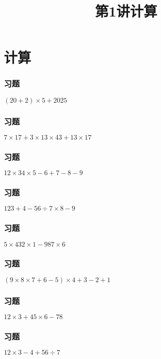 \section{计算}

\title[第1讲\quad 计算]{第1讲\quad 计算} 
\author{}
\date{}
\begin{frame}
    \titlepage
\end{frame}

\begin{frame}
    \frametitle{习题\theframecounter}
    \centering\textit{\Large $(20+2)\times 5 + 2025$}
\end{frame}

\begin{frame}
    \frametitle{习题\theframecounter}
    \centering\textit{\Large $7\times 17 + 3\times 13\times 43 + 13\times 17$}
\end{frame}

\begin{frame}
    \frametitle{习题\theframecounter}
    \centering\textit{\Large $12\times 34\times 5 - 6 + 7 - 8 - 9$}
\end{frame}

\begin{frame}
    \frametitle{习题\theframecounter}    \centering\textit{\Large $123 + 4 - 56\div 7\times 8 - 9$}
\end{frame}

\begin{frame}
    \frametitle{习题\theframecounter}    \centering\textit{\Large $5\times 432\times 1 - 98 7\times 6$}
\end{frame}

\begin{frame}
    \frametitle{习题\theframecounter}    \centering\textit{\Large $(9\times 8\times 7 + 6 - 5)\times 4 + 3 -2 +1$}
\end{frame}

\begin{frame}
    \frametitle{习题\theframecounter}    \centering\textit{\Large $12\times 3 + 45\times 6 - 78$}
\end{frame}

\begin{frame}
    \frametitle{习题\theframecounter}    \centering\textit{\Large $12\times 3 - 4 + 56\div 7$}
\end{frame}

